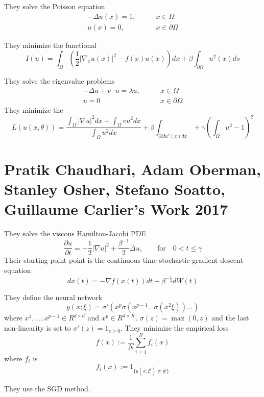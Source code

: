 They solve the Poisson equation
\begin{equation}
 \begin{split}
  -\Delta u(x) = 1, &\qquad x\in \Omega\\
  u(x) = 0,&\qquad x\in \partial \Omega
 \end{split}
\end{equation}

They minimize the functional
\begin{equation}
 I(u) = \int_{\Omega} (\frac{1}{2}|\nabla_x u(x)|^2-f(x)u(x))dx+\beta\int_{\partial \Omega} u^2(x)ds
\end{equation}

They solve the eigenvalue problems
\begin{equation}
 \begin{split}
  - \Delta u + v\cdot u = \lambda u,& \qquad x\in \Omega\\
  u = 0 & \qquad x \in \partial \Omega
 \end{split}
\end{equation}
They  minimize the
\begin{equation}
 L(u(x,\theta)) = \frac{\int_\Omega |\nabla u|^2dx+\int_\Omega vu^2dx}{\int_\Omega u^2dx} + \beta\int_{\partial \Omega u^2(x)dx} + \gamma(\int_{\Omega}u^2 - 1)^2
\end{equation}

\section{Pratik Chaudhari, Adam Oberman, Stanley Osher, Stefano Soatto, Guillaume Carlier's Work 2017 }
They solve the viscous Hamilton-Jacobi PDE
\begin{equation}
 \frac{\partial u}{\partial t} = -\frac{1}{2}|\nabla u|^2 + \frac{\beta^{-1}}{2}\Delta u, \qquad \mbox{for} \quad 0<t\le \gamma
\end{equation}
Their starting point point is the continuous time stochastic gradient descent equation
\begin{equation}
 dx(t) = -\nabla f(x(t))dt +  \beta^{-\frac{1}{2}}dW(t)
\end{equation}

They define the neural network
\begin{equation}
 y(x;\xi) = \sigma'(x^{p}\sigma(x^{p-1}...\sigma(x^2\xi))...)
\end{equation}
where $x^1,...,x^{p-1}\in R^{d\times d}$ and $x^p\in R^{d\times K}$. $\sigma(z) = \max(0,z)$ and the last non-linearity is set to $\sigma'(z) = 1_{z\ge0}$.
They minimize the empirical loss
\begin{equation}
 f(x):=\frac{1}{N}\sum_{i=1}^{N}f_i(x)
\end{equation}
where $f_i$ is
\begin{equation}
 f_i(x):=1_{\{y(x,\xi^i)\neq y^i\}}
\end{equation}

They use the SGD method.

